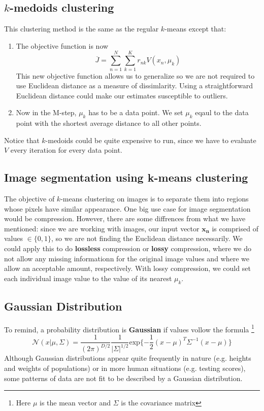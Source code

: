 \documentclass{tufte-handout}
\begin{document}
	\subsection{$k$-medoids clustering}
	This clustering method is the same as the regular $k$-means except that:
	\begin{enumerate}
			\item The objective function is now 
					\[\overline{J} = \sum_{n=1}^{N}\sum_{k=1}^{K}r_{nk}V(x_{n}, \mu_{k})\]
					This new objective function allows us to generalize so we are not required to use 
					Euclidean distance as a measure of dissimlarity. 
					Using a straightforward Euclidean distance could make our estimates susceptible to outliers.

			\item Now in the  M-step, $\mu_{k}$ has to be a data point. We set $\mu_{k}$ eqaul to the data point
					with the shortest average distance to all other points.
	\end{enumerate}
	Notice that $k$-medoids could be quite expensive to run, since we have to evaluate $V$ every iteration for
	every data point.

	\subsection{Image segmentation using k-means clustering}

	The objective of $k$-means clustering on images is to separate them into regions whose pixels have similar
		appearance.
	One big use case for image segmentation would be compression.
	However, there are some diffrences from what we have mentioned: since we are working with images, our 
		input vector $\mathbf{x_{n}}$ is comprised of values $\in\{0,1\}$, so we are not finding the Euclidean
		distance necessarily.
	We could apply this to do \textbf{lossless} compression or \textbf{lossy} compression, where we do not
		allow any missing informationn for the original image values and where we allow an acceptable amount,
		respectively. 
	With lossy compression, we could set each individual image value to the value of its nearest $\mu_{k}$.

	\subsection{Gaussian Distribution}
	To remind, a probability distribution is \textbf{Gaussian} if values vollow the formula
	\footnote{Here $\mu$ is the mean vector and $\Sigma$ is the covariance matrix}
	\[ 
		\mathcal{N}(x|\mu, \Sigma) = \frac{1}{(2\pi)^{D/2}}\frac{1}
		{|\Sigma|^{1/2}}\textrm{exp}\{-\frac{1}{2}(x - \mu)^{T}\Sigma^{-1}(x - \mu)\}
	\]
	Although Gaussian distributions appear quite frequently in nature (e.g. heights and weights of populations)
		or in more human situations (e.g. testing scores), some patterns of data are not fit to be described
		by a Gaussian distribution.
\end{document}
